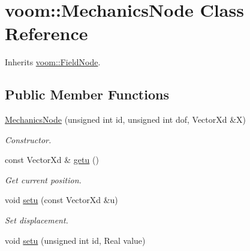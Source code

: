 \hypertarget{classvoom_1_1_mechanics_node}{
\section{voom::MechanicsNode Class Reference}
\label{classvoom_1_1_mechanics_node}
}


Inherits \hyperlink{classvoom_1_1_field_node}{voom::FieldNode}.\subsection*{Public Member Functions}
\begin{DoxyCompactItemize}
\item 
\hypertarget{classvoom_1_1_mechanics_node_a2afd0b3cef7e746c7620d5d90c7b5cff}{
\hyperlink{classvoom_1_1_mechanics_node_a2afd0b3cef7e746c7620d5d90c7b5cff}{MechanicsNode} (unsigned int id, unsigned int dof, VectorXd \&X)}
\label{classvoom_1_1_mechanics_node_a2afd0b3cef7e746c7620d5d90c7b5cff}

\begin{DoxyCompactList}\small\item\em Constructor. \item\end{DoxyCompactList}\item 
\hypertarget{classvoom_1_1_mechanics_node_a9b628862f9b5193c2cff3d0aa8168423}{
const VectorXd \& \hyperlink{classvoom_1_1_mechanics_node_a9b628862f9b5193c2cff3d0aa8168423}{getu} ()}
\label{classvoom_1_1_mechanics_node_a9b628862f9b5193c2cff3d0aa8168423}

\begin{DoxyCompactList}\small\item\em Get current position. \item\end{DoxyCompactList}\item 
\hypertarget{classvoom_1_1_mechanics_node_af20141b233b0dc97cf69f78d78be1845}{
void \hyperlink{classvoom_1_1_mechanics_node_af20141b233b0dc97cf69f78d78be1845}{setu} (const VectorXd \&u)}
\label{classvoom_1_1_mechanics_node_af20141b233b0dc97cf69f78d78be1845}

\begin{DoxyCompactList}\small\item\em Set displacement. \item\end{DoxyCompactList}\item 
\hypertarget{classvoom_1_1_mechanics_node_a280fe5d1ca89fea539acaec37425e574}{
void \hyperlink{classvoom_1_1_mechanics_node_a280fe5d1ca89fea539acaec37425e574}{setu} (unsigned int id, Real value)}
\label{classvoom_1_1_mechanics_node_a280fe5d1ca89fea539acaec37425e574}


\end{DoxyCompactItemize}
